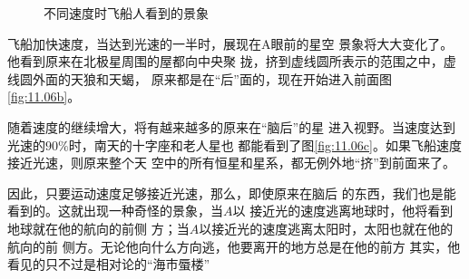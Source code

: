 \begin{figure}[h]
  \centering
  \caption{不同速度时飞船人看到的景象}
  \label{fig:11.06}
\end{figure}

飞船加快速度，当达到光速的一半时，展现在A眼前的星空
景象将大大变化了。他看到原来在北极星周围的屋都向中央聚
拢，挤到虚线圆所表示的范围之中，虚线圆外面的天狼和天蝎，
原来都是在“后”面的，现在开始进入前面\lhbrak 图\ref{fig:11.06b}\rhbrak 。

随着速度的继续增大，将有越来越多的原来在“脑后”的星
进入视野。当速度达到光速的$ 90\% $时，南天的十字座和老人星也
都能看到了\lhbrak 图\ref{fig:11.06c}\rhbrak 。如果飞船速度接近光速，则原来整个天
空中的所有恒星和星系，都无例外地“挤”到前面来了。

因此，只要运动速度足够接近光速，那么，即使原来在脑后
的东西，我们也是能看到的。这就出现一种奇怪的景象，当$ A $以
接近光的速度逃离地球时，他将看到地球就在他的航向的前侧
方；当$ A $以接近光的速度逃离太阳时，太阳也就在他的航向的前
侧方。无论他向什么方向逃，他要离开的地方总是在他的前方
其实，他看见的只不过是相对论的“海市蜃楼”
